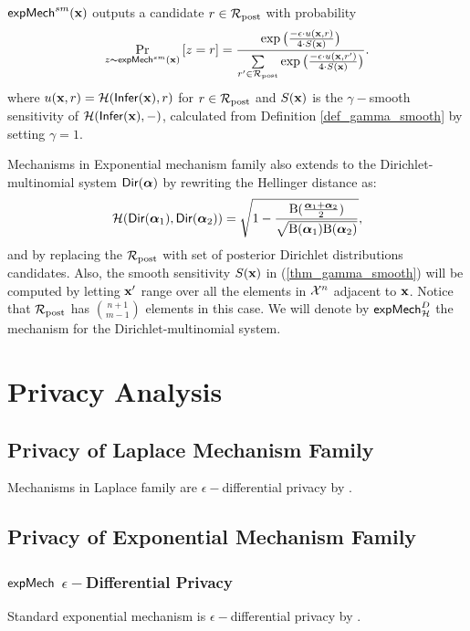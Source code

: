 \documentclass{article}
\begin{document}
\begin{definition}
\label{def_smoo_2}
$\mathsf{expMech}^{sm}(\textbf{x})$ outputs a candidate $r \in \mathcal{R}_{\textup{post}}$ with probability
\begin{equation*}
  \underset{z \thicksim \mathsf{expMech}^{sm}(\textbf{x})}{\Pr}\left[ z = r \right] = \frac {\exp\big(\frac{-\epsilon\cdot u(\textbf{x}, {r})}{4\cdot S(\textbf{x})}\big)}
{\sum\limits_{r'\in \mathcal{R}_{\textup{post}}} \exp \big(\frac{-\epsilon\cdot u(\textbf{x}, r')}{4 \cdot S(\textbf{x})}\big)}.
\end{equation*}
where $u(\textbf{x}, {r}) = \mathcal{H}(\mathsf{Infer}(\textbf{x}),r)$ for $r \in \mathcal{R}_{\textup{post}}$ and $S(\textbf{x})$ is the $\gamma -$smooth sensitivity of $\mathcal{H}(\mathsf{Infer}(\textbf{x}),-)$, calculated from Definition \ref{def_gamma_smooth} by setting $\gamma = 1$.
\end{definition}
Mechanisms in Exponential mechanism family also extends to the Dirichlet-multinomial system $\mathsf{Dir}(\boldsymbol{\alpha})$ by rewriting the Hellinger distance as:
\[
  \mathcal{H}(\mathsf{Dir}(\boldsymbol{\alpha}_1), \mathsf{Dir}(\boldsymbol{\alpha}_2)) = \sqrt{1 - \frac{\textup{B}(\frac{\boldsymbol{\alpha}_1 + \boldsymbol{\alpha}_2}{2})}{\sqrt{\textup{B}(\boldsymbol{\alpha}_1) \textup{B}(\boldsymbol{\alpha}_2)}}},
\]
and by replacing the $\mathcal{R}_{\textup{post}}$ with set of posterior Dirichlet
distributions candidates. Also, the smooth sensitivity $S(\textbf{x})$
in (\ref{thm_gamma_smooth}) will be computed by letting $\textbf{x}'$ range
over all the elements in $\mathcal{X}^{n}$ adjacent to $\textbf{x}$. Notice
that $\mathcal{R}_{\textup{post}}$ has $\binom{n + 1}{m - 1}$ elements in this case. We
will denote by $\mathsf{expMech}^{D}_{\mathcal{H}}$ the mechanism for the
Dirichlet-multinomial system.


\section{Privacy Analysis}

\subsection{Privacy of Laplace Mechanism Family}
Mechanisms in Laplace family are $\epsilon-$differential privacy by \cite{dwork2014algorithmic}.

\subsection{Privacy of Exponential Mechanism Family}
\subsubsection{$\mathsf{expMech}$ $\epsilon-$Differential Privacy}
Standard exponential mechanism is $\epsilon-$differential privacy by \cite{dwork2014algorithmic}.
\end{document}
